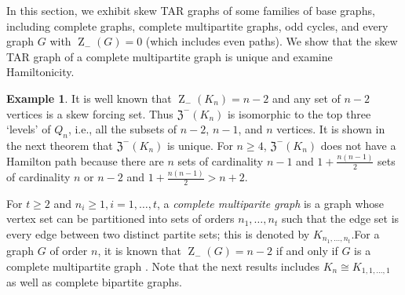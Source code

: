 \documentclass{article}
\numberwithin{figure}{section}
\numberwithin{table}{section}
\numberwithin{equation}{section}
\theoremstyle{definition}
\theoremstyle{definition}
\theoremstyle{definition}
\newtheorem{ex}[thm]{Example}
\newcommand{\Zs}{\operatorname{Z}_-}
\newcommand{\zstar}{\mathfrak{Z}^-}%
\begin{document}
{  In this section, %
 we exhibit skew TAR graphs of some families of base graphs, including complete graphs, complete multipartite graphs, odd cycles, and every   graph $G$ with $\Zs(G)=0$ (which includes  even  paths).    We  show that the skew TAR graph of a complete multipartite graph is unique and examine Hamiltonicity.  
 
 \begin{ex}
  It is well known that $\Zs(K_n)=n-2$ and any set of $n-2$ vertices is a skew forcing set.  Thus $\zstar(K_n)$ is isomorphic to the top three `levels' of $Q_n$, i.e., all the subsets of $n-2$, $n-1$, and $n$ vertices.    It is shown in the next theorem that $\zstar(K_n)$ is unique. For $n\ge 4$, $\zstar(K_n)$ does not have a Hamilton path because there are $n$ sets of cardinality $n-1$ and $1+\frac{n(n-1)}2$ sets of cardinality $n$ or $n-2$ and $1+\frac{n(n-1)}2>n+2$.
 \end{ex}



For $t\ge 2$ and $n_i\ge 1, i=1,\dots,t$, a \emph{complete multiparite graph}  is a graph whose vertex set can be partitioned into sets of orders $n_1,\dots,n_t$ such that the edge set is every edge between two distinct partite sets; this is denoted by $K_{n_1,\dots,n_t}$.For a graph $G$ of order $n$, it is known that $\Zs(G)=n-2$ if and only if $G$ is a complete multipartite graph \cite[Theorem 9.76]{HLS22book}.  Note that the next results includes $K_n\cong K_{1,1,\dots,1}$ as well as complete bipartite graphs.
 
}
\end{document}
